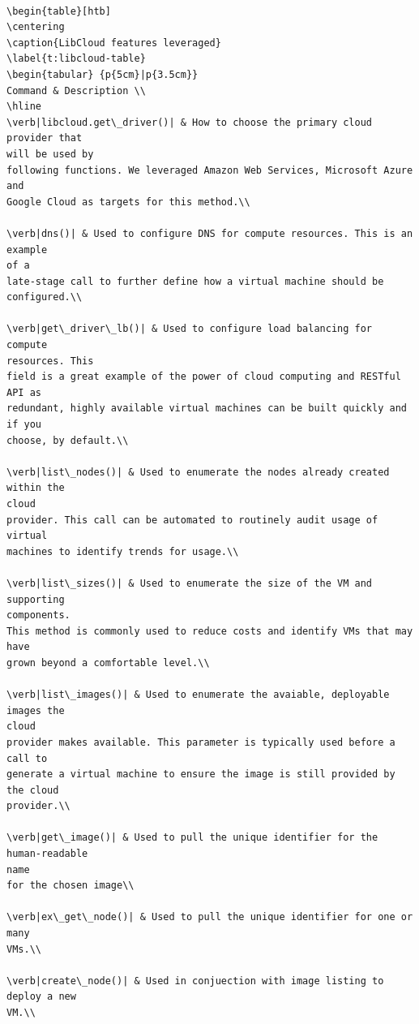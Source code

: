 \begin{verbatim} 

\begin{table}[htb]
\centering
\caption{LibCloud features leveraged}
\label{t:libcloud-table}
\begin{tabular} {p{5cm}|p{3.5cm}}
Command & Description \\
\hline
\verb|libcloud.get\_driver()| & How to choose the primary cloud provider that
will be used by
following functions. We leveraged Amazon Web Services, Microsoft Azure and
Google Cloud as targets for this method.\\

\verb|dns()| & Used to configure DNS for compute resources. This is an example
of a
late-stage call to further define how a virtual machine should be configured.\\

\verb|get\_driver\_lb()| & Used to configure load balancing for compute
resources. This
field is a great example of the power of cloud computing and RESTful API as
redundant, highly available virtual machines can be built quickly and if you
choose, by default.\\

\verb|list\_nodes()| & Used to enumerate the nodes already created within the
cloud
provider. This call can be automated to routinely audit usage of virtual
machines to identify trends for usage.\\

\verb|list\_sizes()| & Used to enumerate the size of the VM and supporting
components.
This method is commonly used to reduce costs and identify VMs that may have
grown beyond a comfortable level.\\

\verb|list\_images()| & Used to enumerate the avaiable, deployable images the
cloud
provider makes available. This parameter is typically used before a call to
generate a virtual machine to ensure the image is still provided by the cloud
provider.\\

\verb|get\_image()| & Used to pull the unique identifier for the human-readable
name
for the chosen image\\

\verb|ex\_get\_node()| & Used to pull the unique identifier for one or many
VMs.\\

\verb|create\_node()| & Used in conjuection with image listing to deploy a new
VM.\\


\end{verbatim}
